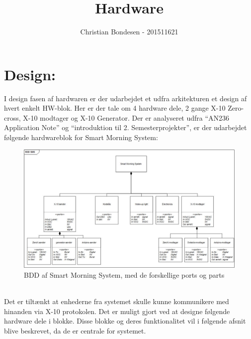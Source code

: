 \documentclass[11pt]{article}
\title{Hardware}
\author{Christian Bondesen - 201511621}
\begin{document}
\maketitle
\section{Design: }
I design fasen af hardwaren er der udarbejdet et udfra arkitekturen et design af hvert enkelt HW-blok. Her er der tale om 4 hardware dele, 2 gange X-10 Zero-cross, X-10 modtager og X-10 Generator. Der er analyseret udfra ``AN236 Application Note'' og ``introduktion til 2. Semesterprojekter'', er der udarbejdet følgende hardwareblok for Smart Morning System: 
\begin{figure}[!h]
\includegraphics[scale = 0.6, ]{Bdd-sms}
\caption{BDD af Smart Morning System, med de forskellige ports og parts}
\end{figure} \\
Det er tiltænkt at enhederne fra systemet skulle kunne kommunikere med hinanden via X-10 protokolen. Det er muligt gjort ved at designe følgende hardware dele i blokke. Disse blokke og deres funktionalitet vil i følgende afsnit blive beskrevet, da de er centrale for systemet. 
\end{document}
